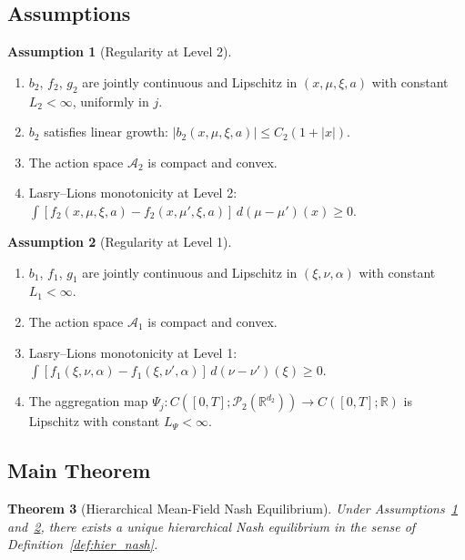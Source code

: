 \documentclass[12pt,a4paper]{article}
\theoremstyle{plain}
\newtheorem{theorem}{Theorem}[section]
\theoremstyle{definition}
\newtheorem{assumption}[theorem]{Assumption}
\newcommand{\R}{\mathbb{R}}
\newcommand{\A}{\mathcal{A}}
\newcommand{\Prob}{\mathcal{P}}
\newcommand{\1}{\mathbbm{1}}
\begin{document}
\subsection{Assumptions}

\begin{assumption}[Regularity at Level 2]
\label{ass:L2}
\begin{enumerate}[label=(L\arabic*)]
\item $b_2$, $f_2$, $g_2$ are jointly continuous and Lipschitz in
  $(x, \mu, \xi, a)$ with constant $L_2 < \infty$, uniformly in $j$.
\item $b_2$ satisfies linear growth: $|b_2(x,\mu,\xi,a)| \leq C_2(1+|x|)$.
\item The action space $\A_2$ is compact and convex.
\item Lasry--Lions monotonicity at Level 2:
  $\int[f_2(x,\mu,\xi,a) - f_2(x,\mu',\xi,a)]\,d(\mu-\mu')(x) \geq 0$.
\end{enumerate}
\end{assumption}

\begin{assumption}[Regularity at Level 1]
\label{ass:L1}
\begin{enumerate}[label=(L\arabic*), start=5]
\item $b_1$, $f_1$, $g_1$ are jointly continuous and Lipschitz in
  $(\xi, \nu, \alpha)$ with constant $L_1 < \infty$.
\item The action space $\A_1$ is compact and convex.
\item Lasry--Lions monotonicity at Level 1:
  $\int[f_1(\xi,\nu,\alpha) - f_1(\xi,\nu',\alpha)]\,d(\nu-\nu')(\xi) \geq 0$.
\item The aggregation map $\Psi_j: C([0,T];\Prob_2(\R^{d_2})) \to C([0,T];\R)$
  is Lipschitz with constant $L_\Psi < \infty$.
\end{enumerate}
\end{assumption}

\subsection{Main Theorem}

\begin{theorem}[Hierarchical Mean-Field Nash Equilibrium]
\label{thm:hier_mfg}
Under Assumptions~\ref{ass:L2} and~\ref{ass:L1}, there exists a unique
hierarchical Nash equilibrium in the sense of Definition~\ref{def:hier_nash}.
\end{theorem}
\end{document}
